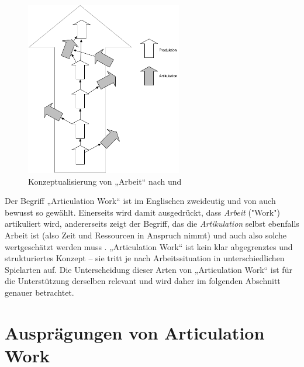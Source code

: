 \begin{figure}[htbp]
	\centering
		\includegraphics[height=3in]{img/ArticulationWork/ArtikulationProduktion.png}
	\caption{Konzeptualisierung von „Arbeit“ nach \citep{Strauss85} und \citep{Fujimura87}}
	\label{fig:img_ArticulationWork_ArtikulationProduktion}
\end{figure}

Der Begriff „Articulation Work“ ist im Englischen zweideutig und von \citeauthor{Strauss85} auch bewusst so gewählt. Einerseits wird damit ausgedrückt, dass \emph{Arbeit} ("Work") artikuliert wird, andererseits zeigt der Begriff, das die \emph{Artikulation} selbst ebenfalls Arbeit ist (also Zeit und Ressourcen in Anspruch nimmt) und auch also solche wertgeschätzt werden muss \citep{Fujimura87}. „Articulation Work“ ist kein klar abgegrenztes und strukturiertes Konzept – sie tritt je nach Arbeitssituation in unterschiedlichen Spielarten auf. Die Unterscheidung dieser Arten von „Articulation Work“ ist für die Unterstützung derselben relevant und wird daher im folgenden Abschnitt genauer betrachtet.

\section{Ausprägungen von Articulation Work} %
\label{sec:arten_von_articulation_work}

